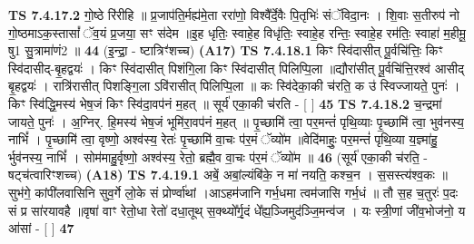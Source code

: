 \documentclass[17pt]{extarticle}
\begin{document}
                                \textbf{ TS 7.4.17.2} \newline
                  गो॒ष्ठे रि॑रीहि ॥ प्र॒जाप॑ति॒र्मह्य॑मे॒ता ररा॑णो॒ विश्वै᳚र्दे॒वैः पि॒तृभिः॑ संॅविदा॒नः । शि॒वाः स॒तीरुप॑ नो गो॒ष्ठमाऽक॒स्तासां᳚ ॅव॒यं प्र॒जया॒ सꣳ स॑देम ॥इ॒ह धृतिः॒ स्वाहे॒ह विधृ॑तिः॒ स्वाहे॒ह रन्तिः॒ स्वाहे॒ह रम॑तिः॒ स्वाहा॑ म॒हीमू॒ षु1 सु॒त्रामा॑णं2 ॥ \textbf{  44 } \newline
                  \newline
                      (इ॒न्द्रा॒ - ष्टात्रिꣳ॑शच्च)  \textbf{(A17)} \newline \newline
                                        \textbf{ TS 7.4.18.1} \newline
                  किꣳ स्वि॑दासीत् पू॒र्वचि॑त्तिः॒ किꣳ स्वि॑दासीद्-बृ॒हद्वयः॑ । किꣳ स्वि॑दासीत् पिशंगि॒ला किꣳ स्वि॑दासीत् पिलिप्पि॒ला ॥द्यौरा॑सीत् पू॒र्वचि॑त्ति॒रश्व॑ आसीद् बृ॒हद्वयः॑ । रात्रि॑रासीत् पिशङ्गि॒ला ऽवि॑रासीत् पिलिप्पि॒ला ॥ कः स्वि॑देका॒की च॑रति॒ क उ॑ स्विज्जायते॒ पुनः॑ । किꣳ स्वि॑द्धि॒मस्य॑ भेष॒जं किꣳ स्वि॑दा॒वप॑नं म॒हत् ॥ सूर्य॑ एका॒की च॑रति - [  ] \textbf{  45} \newline
                  \newline
                                \textbf{ TS 7.4.18.2} \newline
                  च॒न्द्रमा॑ जायते॒ पुनः॑ । अ॒ग्निर्. हि॒मस्य॑ भेष॒जं भूमि॑रा॒वप॑नं म॒हत् ॥ पृ॒च्छामि॑ त्वा॒ पर॒मन्तं॑ पृथि॒व्याः पृ॒च्छामि॑ त्वा॒ भुव॑नस्य॒ नाभिं᳚ । पृ॒च्छामि॑ त्वा॒ वृष्णो॒ अश्व॑स्य॒ रेतः॑ पृ॒च्छामि॑ वा॒चः प॑र॒मं ॅव्यो॑म ॥वेदि॑माहुः॒ पर॒मन्तं॑ पृथि॒व्या य॒ज्ञ्मा॑हु॒ र्भुव॑नस्य॒ नाभिं᳚ । सोम॑माहु॒र्वृष्णो॒ अश्व॑स्य॒ रेतो॒ ब्रह्मै॒व वा॒चः प॑र॒मं ॅव्यो॑म ॥ \textbf{  46} \newline
                  \newline
                      (सूर्य॑ एका॒की च॑रति॒ - षट्च॑त्वारिꣳशच्च)  \textbf{(A18)} \newline \newline
                                        \textbf{ TS 7.4.19.1} \newline
                  अबें॒ अबां॒ल्यंबि॑के॒ न मा॑ नयति॒ कश्च॒न । स॒सस्त्य॑श्व॒कः ॥ सुभ॑गे॒ कांपी॑लवासिनि सुव॒र्गे लो॒के सं प्रोर्ण्वा॑थां ।आऽहम॑जानि गर्भ॒धमा त्वम॑जासि गर्भ॒धं ॥ तौ स॒ह च॒तुरः॑ प॒दः सं प्र सा॑रयावहै ॥वृषा॑ वाꣳ रेतो॒धा रेतो॑ दधा॒तूथ् स॒क्थ्यो᳚र्गृ॒दं धे᳚ह्य॒ञ्जिमुद॑ञ्जि॒मन्व॑ज । यः स्त्री॒णां जी॑व॒भोज॑नो॒ य आ॑सां - [  ] \textbf{  47} \newline
                  \newline
\end{document}
